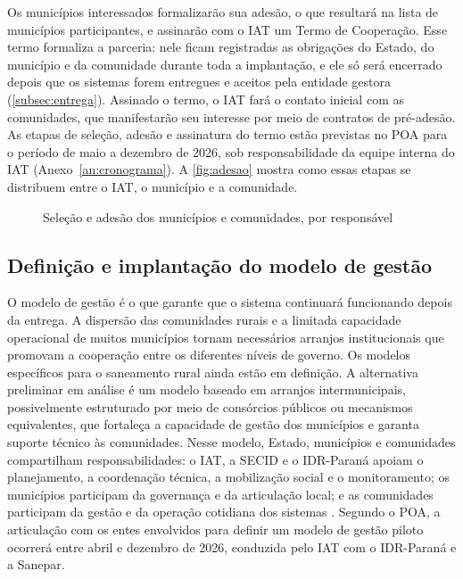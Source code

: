 Os municípios interessados formalizarão sua adesão, o que resultará na lista
de municípios participantes, e assinarão com o IAT um Termo de Cooperação.
Esse termo formaliza a parceria: nele ficam registradas as obrigações do Estado, do município e da comunidade durante
toda a implantação, e ele só será encerrado depois que os sistemas forem
entregues e aceitos pela entidade gestora
(\autoref{subsec:entrega}). Assinado o termo, o IAT fará o contato inicial com
as comunidades, que manifestarão seu interesse por meio de contratos de
pré-adesão. As etapas de seleção, adesão e assinatura do termo estão
previstas no POA para o período de maio a dezembro de 2026, sob
responsabilidade da equipe interna do IAT (Anexo~\ref{an:cronograma}). A
\autoref{fig:adesao} mostra como essas etapas se distribuem entre o IAT, o
município e a comunidade.

\begin{figure}[htbp]
  \centering
  \caption{Seleção e adesão dos municípios e comunidades, por responsável}
  \label{fig:adesao}
\end{figure}

\subsection{Definição e implantação do modelo de gestão}
\label{subsec:modelos-gestao}

O modelo de gestão é o que garante que o sistema continuará funcionando
depois da entrega. A dispersão das comunidades rurais e a limitada capacidade
operacional de muitos municípios tornam necessários arranjos institucionais
que promovam a cooperação entre os diferentes níveis de governo. Os modelos
específicos para o saneamento rural ainda estão em definição. A alternativa
preliminar em análise é um modelo baseado em arranjos intermunicipais,
possivelmente estruturado por meio de consórcios públicos ou mecanismos
equivalentes, que fortaleça a capacidade de gestão dos municípios e garanta
suporte técnico às comunidades. Nesse modelo, Estado, municípios e comunidades
compartilham responsabilidades: o IAT, a SECID e o IDR-Paraná apoiam o
planejamento, a coordenação técnica, a mobilização social e o monitoramento;
os municípios participam da governança e da articulação local; e as
comunidades participam da gestão e da operação cotidiana dos sistemas
\cite{mop2026}. Segundo o POA, a articulação com os entes envolvidos para
definir um modelo de gestão piloto ocorrerá entre abril e dezembro de 2026,
conduzida pelo IAT com o IDR-Paraná e a Sanepar.

